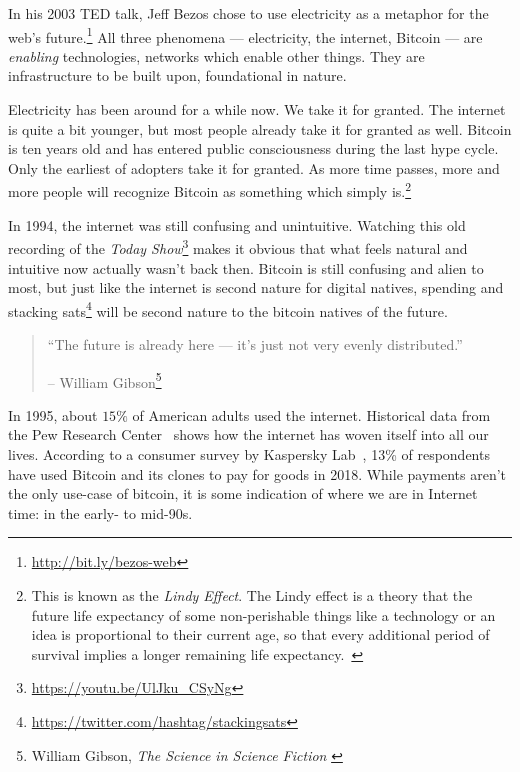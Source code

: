 In his 2003 TED talk, Jeff Bezos chose to use electricity as a metaphor for the
web's future.\footnote{\url{http://bit.ly/bezos-web}} All three phenomena ---
electricity, the internet, Bitcoin --- are \textit{enabling} technologies,
networks which enable other things. They are infrastructure to be built upon,
foundational in nature.

Electricity has been around for a while now. We take it for granted. The
internet is quite a bit younger, but most people already take it for
granted as well. Bitcoin is ten years old and has entered public
consciousness during the last hype cycle. Only the earliest of adopters
take it for granted. As more time passes, more and more people will
recognize Bitcoin as something which simply is.\footnote{This is known as the
\textit{Lindy Effect}. The Lindy effect is a theory that the future life expectancy
of some non-perishable things like a technology or an idea is proportional to
their current age, so that every additional period of survival implies a longer
remaining life expectancy.~\cite{wiki:lindy}}

In 1994, the internet was still confusing and unintuitive. Watching this old
recording of the \textit{Today
Show}\footnote{\url{https://youtu.be/UlJku_CSyNg}} makes it obvious that what
feels natural and intuitive now actually wasn't back then. Bitcoin is still
confusing and alien to most, but just like the internet is second nature for
digital natives, spending and stacking
sats\footnote{\url{https://twitter.com/hashtag/stackingsats}} will be second
nature to the bitcoin natives of the future.

\begin{quotation}\begin{samepage}
\enquote{The future is already here --- it's just not very evenly
distributed.}
\begin{flushright} -- William Gibson\footnote{William Gibson, \textit{The Science in Science Fiction} \cite{william-gibson}}
\end{flushright}\end{samepage}\end{quotation}

In 1995, about $15\%$ of American adults used the internet. Historical
data from the Pew Research Center~\cite{pew-research} shows how the internet has woven
itself into all our lives. According to a consumer survey by Kaspersky
Lab~\cite{web:kaspersky}, 13\% of respondents have used Bitcoin and its clones to pay for
goods in 2018. While payments aren't the only use-case of bitcoin, it is
some indication of where we are in Internet time: in the early- to
mid-90s.

